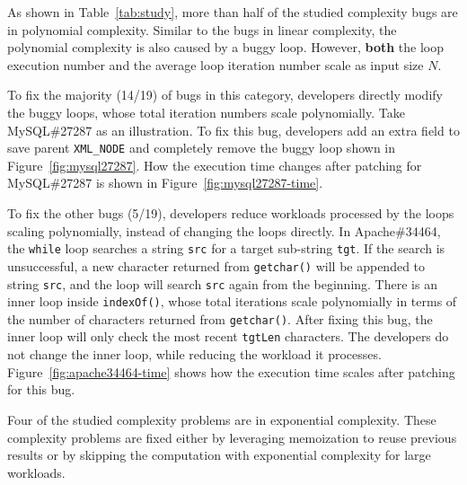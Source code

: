 As shown in Table~\ref{tab:study}, 
more than half of the studied complexity bugs are in polynomial complexity. 
Similar to the bugs in linear complexity,
the polynomial complexity is also caused by a buggy loop.
However, {\bf both} the loop execution number 
and the average loop iteration number
scale as input size $N$.




%

To fix the majority (14/19) of bugs in this category,
developers directly modify the buggy loops, 
whose total iteration numbers scale polynomially.
Take MySQL\#27287 as an illustration.
To fix this bug,
developers add an extra field to save parent \texttt{XML\_NODE}
and completely remove the buggy loop shown in Figure~\ref{fig:mysql27287}.
How the execution time changes after patching for MySQL\#27287 is 
shown in Figure~\ref{fig:mysql27287-time}. 

To fix the other bugs (5/19),
developers reduce workloads processed by the loops scaling polynomially, 
instead of changing the loops directly.
In Apache\#34464, the 
\texttt{while} loop searches a string \texttt{src}
for a target sub-string \texttt{tgt}.
If the search is unsuccessful, 
a new character returned from \texttt{getchar()} will be appended 
to string \texttt{src}, 
and the loop will search \texttt{src} again from the beginning. 
There is an inner loop inside \texttt{indexOf()}, whose total iterations 
scale polynomially in terms of the number of characters returned from \texttt{getchar()}. 
After fixing this bug, the inner loop will only check the most recent \texttt{tgtLen} characters.
The developers do not change the inner loop, 
while reducing the workload it processes.   
Figure~\ref{fig:apache34464-time} shows 
how the execution time scales after patching for 
this bug.



Four of the studied complexity problems are in exponential complexity. 
These complexity problems are fixed 
either by leveraging memoization to reuse previous results 
or by skipping the computation with exponential complexity for large workloads. 



